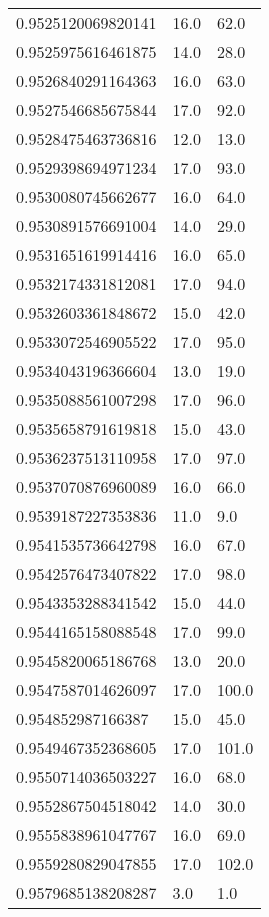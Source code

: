 \begin{center}
\begin{supertabular}[H]{p{0.30\textwidth}p{0.05\textwidth}p{0.05\textwidth}}
0.9525120069820141 & 16.0 & 62.0 \\ 
0.9525975616461875 & 14.0 & 28.0 \\ 
0.9526840291164363 & 16.0 & 63.0 \\ 
0.9527546685675844 & 17.0 & 92.0 \\ 
0.9528475463736816 & 12.0 & 13.0 \\ 
0.9529398694971234 & 17.0 & 93.0 \\ 
0.9530080745662677 & 16.0 & 64.0 \\ 
0.9530891576691004 & 14.0 & 29.0 \\ 
0.9531651619914416 & 16.0 & 65.0 \\ 
0.9532174331812081 & 17.0 & 94.0 \\ 
0.9532603361848672 & 15.0 & 42.0 \\ 
0.9533072546905522 & 17.0 & 95.0 \\ 
0.9534043196366604 & 13.0 & 19.0 \\ 
0.9535088561007298 & 17.0 & 96.0 \\ 
0.9535658791619818 & 15.0 & 43.0 \\ 
0.9536237513110958 & 17.0 & 97.0 \\ 
0.9537070876960089 & 16.0 & 66.0 \\ 
0.9539187227353836 & 11.0 & 9.0 \\ 
0.9541535736642798 & 16.0 & 67.0 \\ 
0.9542576473407822 & 17.0 & 98.0 \\ 
0.9543353288341542 & 15.0 & 44.0 \\ 
0.9544165158088548 & 17.0 & 99.0 \\ 
0.9545820065186768 & 13.0 & 20.0 \\ 
0.9547587014626097 & 17.0 & 100.0 \\ 
0.954852987166387 & 15.0 & 45.0 \\ 
0.9549467352368605 & 17.0 & 101.0 \\ 
0.9550714036503227 & 16.0 & 68.0 \\ 
0.9552867504518042 & 14.0 & 30.0 \\ 
0.9555838961047767 & 16.0 & 69.0 \\ 
0.9559280829047855 & 17.0 & 102.0 \\ 
0.9579685138208287 & 3.0 & 1.0 \\ 
\end{supertabular}
\end{center}
